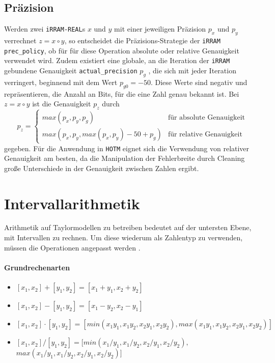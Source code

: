 \subsection{Präzision}
Werden zwei \verb+iRRAM-REAL+s $x$ und $y$ mit einer jeweiligen Präzision $p_x$ und $p_y$ verrechnet $z = x \circ y$, so entscheidet die Präzisions-Strategie der \verb+iRRAM+ \verb+prec_policy+, ob für für diese Operation absolute oder relative Genauigkeit verwendet wird. Zudem existiert eine globale, an die Iteration der \verb+iRRAM+ gebundene Genauigkeit \verb+actual_precision+ $p_g$ , die sich mit jeder Iteration verringert, beginnend mit dem Wert $p_{g0} = -50$. Diese Werte sind negativ und repräsentieren, die Anzahl an Bits, für die eine Zahl genau bekannt ist. Bei $z = x\circ y$ ist die Genauigkeit $p_z$ durch
$$p_z = \begin{cases}
         max(p_x, p_y, p_g) & \text{für absolute Genauigkeit}\\
         max(p_x, p_y, max(p_x, p_y) - 50 + p_g) & \text{für relative Genauigkeit}
        \end{cases}
$$
gegeben.
Für die Anwendung in \verb+HOTM+ eignet sich die Verwendung von relativer Genauigkeit am besten, da die Manipulation der Fehlerbreite durch Cleaning große Unterschiede in der Genauigkeit zwischen Zahlen ergibt.



\section{Intervallarithmetik}
\label{sec:numint}
Arithmetik auf Taylormodellen zu betreiben bedeutet auf der untersten Ebene, mit Intervallen zu rechnen. Um diese wiederum als Zahlentyp zu verwenden, müssen die Operationen angepasst werden \cite{moore1979}.

\paragraph{Grundrechenarten}
\begin{itemize}
    \item[] $[x_1, x_2] + [y_1, y_2] = [x_1 + y_1, x_2 + y_2]$
    \item[] $[x_1, x_2] - [y_1, y_2] = [x_1 - y_2, x_2 - y_1]$
    \item[] $[x_1, x_2] \cdot [y_1, y_2] = [min(x_1 y_1, x_1 y_2, x_2 y_1, x_2 y_2), max(x_1 y_1, x_1 y_2, x_2 y_1, x_2 y_2)]$
    \item[] $[x_1, x_2] / [y_1, y_2] = [min(x_1 / y_1, x_1 / y_2, x_2 / y_1, x_2 / y_2),$\\ $max(x_1 /y_1, x_1 /y_2, x_2 /y_1, x_2 /y_2)]$
\end{itemize}
